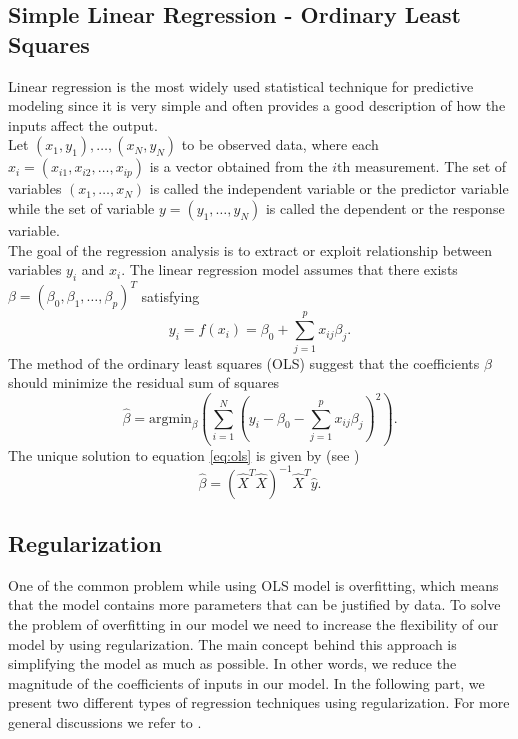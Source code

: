 \documentclass [11pt]{article}
\begin{document}
\subsection{Simple Linear Regression - Ordinary Least Squares}
Linear regression is the most widely used statistical technique for predictive modeling since it is very simple and often provides a good description of how the inputs affect the output.\\
Let $(x_{1},y_{1}),\ldots,(x_{N},y_{N})$ to be observed data, where each $x_{i} = (x_{i1},x_{i2},\ldots,x_{i p})$ is a vector obtained from the $i\text{th}$ measurement. The set of variables $(x_{1},\ldots,x_{N})$ is called the independent variable or the predictor variable while the set of variable $y=(y_{1},\ldots,y_{N})$ is called the dependent or the response variable. \\
The goal of the regression analysis is to extract or exploit relationship between variables $y_i$ and $x_i$. The linear regression model assumes that there exists $\beta=(\beta_{0},\beta_{1},\ldots,\beta_{p})^{T}$ satisfying 
\begin{equation}
y_{i}=f(x_{i})=\beta_{0} + \sum_{j=1}^{p}x_{ij}\beta_{j}.
\end{equation}
The method of the ordinary least squares (OLS) suggest that the coefficients $\beta$ should minimize the residual sum of squares
\begin{equation}
\hat{\beta}=\text{argmin}_{\beta} ( \sum_{i=1}^{N}(y_{i}- \beta_{0}- \sum_{j=1}^{p}x_{ij}\beta_{j})^{2}).
\label{eq:ols}
\end{equation}
The unique solution to equation \eqref{eq:ols} is given by (see \cite{def})
\begin{equation}
\hat{\beta} =\left(\hat{X}^T\hat{X}\right)^{-1}\hat{X}^T\hat{y}.
\end{equation}

\subsection{Regularization}
One of the common problem while using OLS model is overfitting, which means that the model contains more parameters that can be justified by data. To solve the problem of overfitting in our model we need to increase the flexibility of our model by using regularization. The main concept behind this approach is simplifying the model as much as possible. In other words, we reduce the magnitude of the coefficients of inputs in our model. In the following part, we present two different types of regression techniques using regularization. For more general discussions we refer to \cite{abc}.
\end{document}
